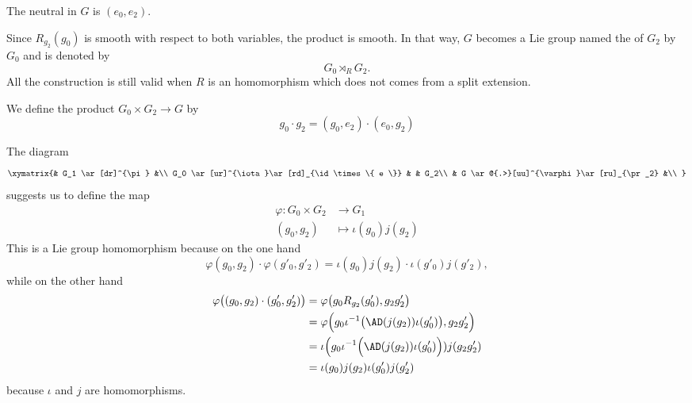 The neutral in $G$ is $(e_0,e_2)$.

Since $R_{g_2}(g_0)$ is smooth with respect to both variables, the product is smooth. In that way, $G$ becomes a Lie group named the  of $G_2$ by $G_0$ and is denoted by
\begin{equation}
	G_0 \rtimes_RG_2.
\end{equation}
All the construction is still valid when $R$ is an homomorphism which does not comes from a split extension.

We define the product $G_0\times G_2\to G$ by
\begin{equation}
	g_0\cdot g_2=(g_0,e_2)\cdot(e_0,g_2)
\end{equation}

The diagram
\begin{equation}
	\xymatrix{%
		&       G_1 \ar[dr]^{\pi}           &\\
		G_0 \ar[ur]^{\iota}\ar[rd]_{\id\times\{ e \}}   &       & G_2\\
		&       G \ar@{.>}[uu]^{\varphi}\ar[ru]_{\pr_2}     &\\
	}
\end{equation}
suggests us to define the map
\begin{equation}
	\begin{aligned}
		\varphi\colon G_0\times G_2 & \to G_1                  \\
		(g_0,g_2)                   & \mapsto \iota(g_0)j(g_2)
	\end{aligned}
\end{equation}
This is a Lie group homomorphism because on the one hand
\begin{equation}
	\varphi(g_0,g_2)\cdot \varphi(g'_0,g'_2)=\iota(g_0)j(g_2)\cdot \iota(g'_0)j(g'_2),
\end{equation}
while on the other hand
\begin{equation}
	\begin{aligned}[]
		\varphi\big( (g_0,g_2)\cdot (g'_0,g'_2) \big) & =\varphi\big( g_0R_{g_2}(g'_0),g_2g'_2 \big)                                \\
		                                              & =\varphi\Big( g_0\iota^{-1}\big( \AD(j(g_2))\iota(g'_0) \big),g_2g'_2 \Big) \\
		                                              & =\iota\Big(g_0\iota^{-1}\Big( \AD(j(g_2))\iota(g'_0) \Big))j(g_2g'_2)       \\
		                                              & =\iota(g_0)j(g_2)\iota(g'_0)j(g'_2)
	\end{aligned}
\end{equation}
because $\iota$ and $j$ are homomorphisms.


